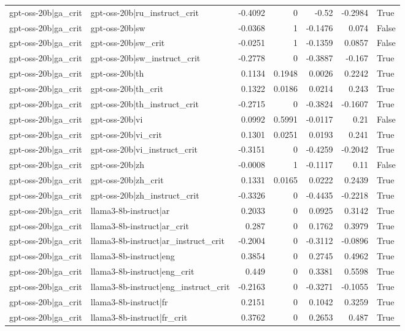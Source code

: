 \begin{table}
\begin{tabular}{l l r r r r l}
gpt-oss-20b|ga_crit & gpt-oss-20b|ru_instruct_crit & -0.4092 & 0 & -0.52 & -0.2984 & True \\
gpt-oss-20b|ga_crit & gpt-oss-20b|sw & -0.0368 & 1 & -0.1476 & 0.074 & False \\
gpt-oss-20b|ga_crit & gpt-oss-20b|sw_crit & -0.0251 & 1 & -0.1359 & 0.0857 & False \\
gpt-oss-20b|ga_crit & gpt-oss-20b|sw_instruct_crit & -0.2778 & 0 & -0.3887 & -0.167 & True \\
gpt-oss-20b|ga_crit & gpt-oss-20b|th & 0.1134 & 0.1948 & 0.0026 & 0.2242 & True \\
gpt-oss-20b|ga_crit & gpt-oss-20b|th_crit & 0.1322 & 0.0186 & 0.0214 & 0.243 & True \\
gpt-oss-20b|ga_crit & gpt-oss-20b|th_instruct_crit & -0.2715 & 0 & -0.3824 & -0.1607 & True \\
gpt-oss-20b|ga_crit & gpt-oss-20b|vi & 0.0992 & 0.5991 & -0.0117 & 0.21 & False \\
gpt-oss-20b|ga_crit & gpt-oss-20b|vi_crit & 0.1301 & 0.0251 & 0.0193 & 0.241 & True \\
gpt-oss-20b|ga_crit & gpt-oss-20b|vi_instruct_crit & -0.3151 & 0 & -0.4259 & -0.2042 & True \\
gpt-oss-20b|ga_crit & gpt-oss-20b|zh & -0.0008 & 1 & -0.1117 & 0.11 & False \\
gpt-oss-20b|ga_crit & gpt-oss-20b|zh_crit & 0.1331 & 0.0165 & 0.0222 & 0.2439 & True \\
gpt-oss-20b|ga_crit & gpt-oss-20b|zh_instruct_crit & -0.3326 & 0 & -0.4435 & -0.2218 & True \\
gpt-oss-20b|ga_crit & llama3-8b-instruct|ar & 0.2033 & 0 & 0.0925 & 0.3142 & True \\
gpt-oss-20b|ga_crit & llama3-8b-instruct|ar_crit & 0.287 & 0 & 0.1762 & 0.3979 & True \\
gpt-oss-20b|ga_crit & llama3-8b-instruct|ar_instruct_crit & -0.2004 & 0 & -0.3112 & -0.0896 & True \\
gpt-oss-20b|ga_crit & llama3-8b-instruct|eng & 0.3854 & 0 & 0.2745 & 0.4962 & True \\
gpt-oss-20b|ga_crit & llama3-8b-instruct|eng_crit & 0.449 & 0 & 0.3381 & 0.5598 & True \\
gpt-oss-20b|ga_crit & llama3-8b-instruct|eng_instruct_crit & -0.2163 & 0 & -0.3271 & -0.1055 & True \\
gpt-oss-20b|ga_crit & llama3-8b-instruct|fr & 0.2151 & 0 & 0.1042 & 0.3259 & True \\
gpt-oss-20b|ga_crit & llama3-8b-instruct|fr_crit & 0.3762 & 0 & 0.2653 & 0.487 & True \\

\end{tabular}
\end{table}
